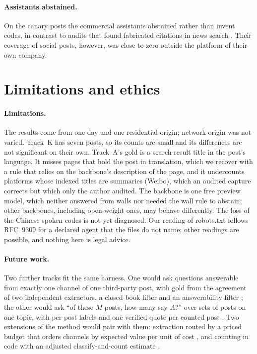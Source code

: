 \paragraph{Assistants abstained.}
On the canary posts the commercial assistants abstained rather than invent codes, in contrast to audits that found
fabricated citations in news search \citep{jazwinska2025tow}. Their coverage of social posts, however, was close to
zero outside the platform of their own company.

\section{Limitations and ethics}\label{sec:limits}

\paragraph{Limitations.}
The results come from one day and one residential origin; network origin was not varied. Track~K has seven posts, so
its counts are small and its differences are not significant on their own. Track~A's gold is a search-result title in
the post's language. It misses pages that hold the post in translation, which we recover with a rule that relies on
the backbone's description of the page, and it undercounts platforms whose indexed titles are summaries (Weibo), which
an audited capture corrects but which only the author audited. The backbone is one free preview model, which neither
answered from walls nor needed the wall rule to abstain; other backbones, including open-weight
ones, may behave differently. The loss of the Chinese spoken codes is not yet diagnosed. Our reading of robots.txt follows
RFC~9309 for a declared agent that the files do not name; other readings are possible, and nothing here is legal
advice.

\paragraph{Future work.}
Two further tracks fit the same harness. One would ask questions answerable from exactly one channel of one
third-party post, with gold from the agreement of two independent extractors, a closed-book filter and an
answerability filter \citep{lee2026vragbench,wei2025browsecomp}; the other would ask ``of these $M$ posts, how many
say $A$?'' over sets of posts on one topic, with per-post labels and one verified quote per counted post
\citep{tang2025qqsum}. Two extensions of the method would pair with them: extraction routed by a priced budget that
orders channels by expected value per unit of cost \citep{liu2025bats,xie2026slimsearcher}, and counting in code with
an adjusted classify-and-count estimate \citep{forman2008quantifying,kim2025scaling,bertsch2025oolong}.

